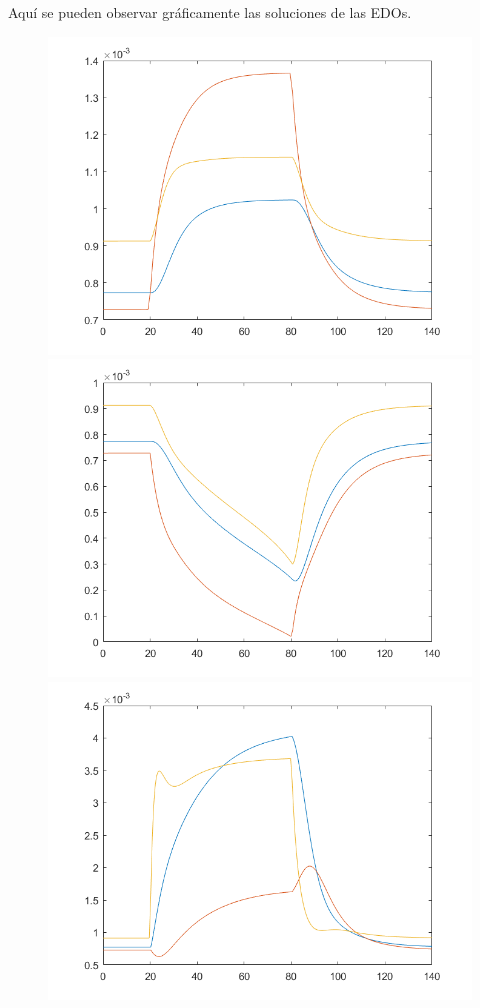 Aqu\'i se pueden observar gr\'aficamente las soluciones de las EDOs.
\begin{figure}[h!]
\centering
\includegraphics[scale=0.3]{../a1.png}\hspace{0.01cm}
\includegraphics[scale=0.3]{../b1.png}\hspace{0.01cm}
\includegraphics[scale=0.3]{../c1.png}\\

\end{figure}
